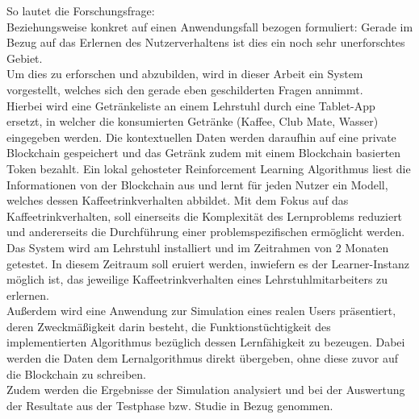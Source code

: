 So lautet die Forschungsfrage:  \\
Beziehungsweise konkret auf einen Anwendungsfall bezogen formuliert: 
Gerade im Bezug auf das Erlernen des Nutzerverhaltens ist dies ein noch sehr unerforschtes Gebiet. \\
Um dies zu erforschen und abzubilden, wird in dieser Arbeit ein System vorgestellt, welches sich den gerade eben geschilderten Fragen annimmt. \\
Hierbei wird eine Getränkeliste an einem Lehrstuhl durch eine Tablet-App ersetzt, in welcher die konsumierten Getränke (Kaffee, Club Mate, Wasser) eingegeben werden. 
Die kontextuellen Daten werden daraufhin auf eine private Blockchain gespeichert und das Getränk zudem mit einem Blockchain basierten Token bezahlt. 
Ein lokal gehosteter Reinforcement Learning Algorithmus liest die Informationen von der Blockchain aus und lernt für jeden Nutzer ein Modell, welches dessen Kaffeetrinkverhalten abbildet. Mit dem Fokus auf das Kaffeetrinkverhalten, soll einerseits die Komplexität des Lernproblems reduziert und andererseits die Durchführung einer problemspezifischen  ermöglicht werden. \\
Das System wird am Lehrstuhl installiert und im Zeitrahmen von 2 Monaten getestet. In diesem Zeitraum soll eruiert werden, inwiefern es der Learner-Instanz möglich ist, das jeweilige Kaffeetrinkverhalten eines Lehrstuhlmitarbeiters zu erlernen. \\
Außerdem wird eine Anwendung zur Simulation eines realen Users präsentiert, deren Zweckmäßigkeit darin besteht, die Funktionstüchtigkeit des implementierten Algorithmus bezüglich dessen Lernfähigkeit zu bezeugen. Dabei werden die Daten dem Lernalgorithmus direkt übergeben, ohne diese zuvor auf die Blockchain zu schreiben. \\
Zudem werden die Ergebnisse der Simulation analysiert und bei der Auswertung der Resultate aus der Testphase bzw. Studie in Bezug genommen. 

